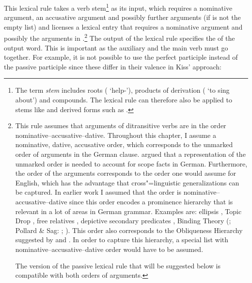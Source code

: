 \noindent
This lexical rule takes a verb stem\footnote{%
	The term \emph{stem} includes roots ( `help-'), products of derivation
        ( `to sing about') and compounds. The lexical rule can therefore also be applied to
        stems like  and derived forms such as .%
} as its input, which requires a nominative argument, an accusative argument and possibly further arguments (if  is not the empty
list) and licenses a lexical entry that requires a nominative argument and possibly the arguments in
.\footnote{%
  This rule assumes that arguments of ditransitive verbs are in the order nominative--accusative--dative. Throughout this chapter, I assume a nominative, dative, accusative order, which
  corresponds to the unmarked order of arguments in the German clause. \citet{Kiss2001a} argued that
  a representation of the unmarked order is needed to account for scope facts in
  German. Furthermore, the order of the arguments corresponds to the order one would assume for
  English, which has the advantage that cross"=linguistic generalizations can be captured. In
  earlier work I assumed that the order is nominative--accusative--dative since this order encodes a
  prominence hierarchy that is relevant in a lot of areas in German grammar. Examples are: ellipsis \citep{Klein85},
  Topic Drop \citep{Fries88b}, free relatives
  \citep{Bausewein90,Pittner95b,Mueller99b},
  depictive secondary predicates \citep{Mueller2001c,Mueller2002b,Mueller2008a},
  Binding Theory (\citealp{Grewendorf85a}; Pollard \& Sag: \citeyear{PS92a};
  \citeyear[Chapter~6]{ps2}). This order also corresponds to the Obliqueness
  Hierarchy suggested by \citet{KC77a} and \citet{Pullum77a}. In order to capture
  this hierarchy, a special list with nominative--accusative--dative order would have to be assumed.

  The version of the passive lexical rule that will be suggested below is compatible with both orders of arguments.
} The output
of the lexical rule specifies the \vformv of the output word. This is important as the auxiliary and
the main verb must go together. For example, it is not possible to use the perfect participle instead of the passive participle since these differ
in their valence in Kiss' approach:
\eal
{}
\zl

